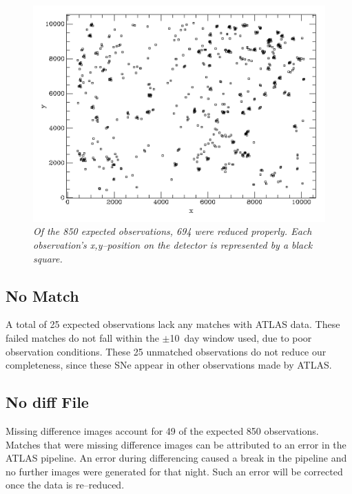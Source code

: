 \begin{figure}[h!]%
 \begin{center}
    \includegraphics[width=1\linewidth]{figures/plotxy_694_good_obs.png}%
     \caption{\it \small{Of the 850 expected observations, 694 were reduced properly.  Each observation's x,y--position on the detector is represented by a black square.~\label{fig:xy}}}%
  \end{center}%
\end{figure}



\subsection{No Match}\label{sec:nomatch}
A total of 25 expected observations lack any matches with ATLAS data. These failed 
matches do not fall within the $\pm$10~day window used, due to poor observation 
conditions.  
These 25 unmatched observations do not reduce our completeness, since these SNe 
appear in other observations made by ATLAS. 


\subsection{No diff File}
\indent Missing difference images account for 49 of the expected 850 observations. 
Matches that were missing difference images can be attributed to an error in the 
ATLAS pipeline. An error during differencing caused a break in the pipeline and no 
further images were generated for that night. Such an error will be corrected once 
the data is re--reduced.



